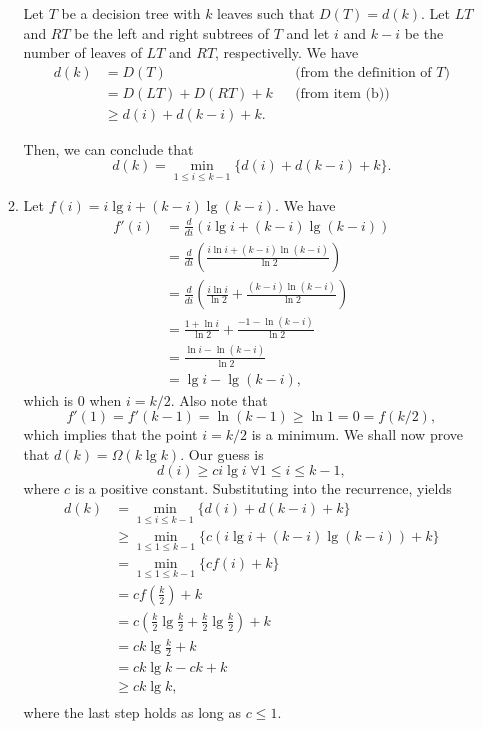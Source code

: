 \documentclass{report}
\makeatletter
\renewenvironment{framed}{%
 \def\FrameCommand##1{\hskip\@totalleftmargin
 \fboxsep=\FrameSep\fbox{##1}}%
 \MakeFramed {\advance\hsize-\width
   \@totalleftmargin\z@ \linewidth\hsize
   \@setminipage}}%
 {\par\unskip\endMakeFramed}
\DeclareMathOperator{\Forall}{\forall}
\makeatother
\begin{document}
\begin{enumerate}
\begin{framed}
\begin{enumerate}
{Let $T$ be a decision tree with $k$ leaves such that $D(T) = d(k)$. Let $LT$ and
$RT$ be the left and right subtrees of $T$ and let $i$ and $k - i$ be the number
of leaves of $LT$ and $RT$, respectivelly. We have
\begin{equation*}
\begin{aligned}
  d(k) &=   D(T) && \text{(from the definition of $T$)}\\
       &=   D(LT) + D(RT) + k && \text{(from item (b))}\\
       &\ge d(i) + d(k - i) + k.
\end{aligned}
\end{equation*}

Then, we can conclude that
\[
  d(k) = \min_{1 \le i \le k - 1} \{d(i) + d(k - i) + k\}.
\]
}

\newpage

\item{
Let $f(i) = i \lg i + (k - i) \lg (k - i)$. We have
\begin{equation*}
\begin{aligned}
  f'(i) &= \frac{d}{di} \left( i \lg i + (k - i) \lg (k - i) \right)\\
        &= \frac{d}{di} \left( \frac{i \ln i + (k - i) \ln (k - i)}{\ln 2} \right)\\
        &= \frac{d}{di} \left( \frac{i \ln i}{\ln 2} + \frac{(k - i) \ln (k - i)}{\ln 2} \right)\\
        &= \frac{1 + \ln i}{\ln 2} + \frac{- 1 - \ln (k - i)}{\ln 2}\\
        &= \frac{\ln i - \ln (k - i)}{\ln 2}\\
        &= \lg i - \lg (k - i),
\end{aligned}
\end{equation*}
which is 0 when $i = k/2$. Also note that
\[
  f'(1) = f'(k - 1) = \ln(k - 1) \ge \ln 1 = 0 = f(k/2),
\]
which implies that the point $i = k/2$ is a minimum. We shall now prove that
$d(k) = \Omega(k \lg k)$. Our guess is
\[
  d(i) \ge c i \lg i \; \Forall 1 \le i \le k - 1,
\]
where $c$ is a positive constant. Substituting into the recurrence, yields
\begin{equation*}
\begin{aligned}
  d(k) &=   \min_{1 \le i \le k - 1} \{d(i) + d(k - i) + k\}\\
       &\ge \min_{1 \le 1 \le k - 1} \{c (i \lg i + (k - i) \lg (k - i)) + k\}\\
       &=   \min_{1 \le 1 \le k - 1} \{c f(i) + k\}\\
       &=   c f\left(\frac{k}{2}\right) + k\\
       &=   c \left(\frac{k}{2} \lg \frac{k}{2} + \frac{k}{2} \lg \frac{k}{2}\right) + k\\
       &=   c k \lg \frac{k}{2} + k\\
       &=   c k \lg k - c k + k\\
       &\ge c k \lg k,\\
\end{aligned}
\end{equation*}
where the last step holds as long as $c \le 1$.
}


\end{enumerate}
\end{framed}
\end{enumerate}
\end{document}

